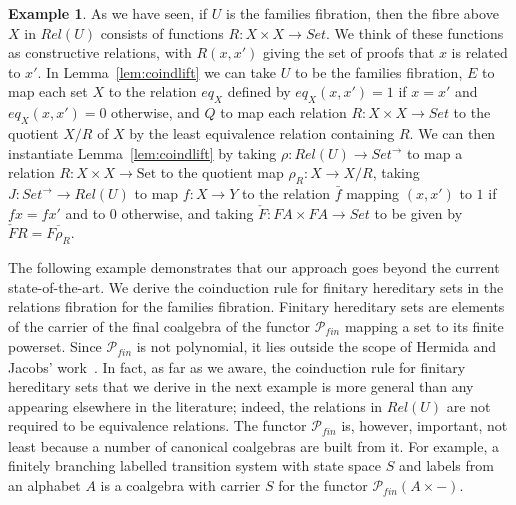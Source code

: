\documentclass{LMCS}
\newcommand{\ra}{\rightarrow}
\newcommand{\Set}{\mbox{Set}}
\newcommand\Ps{\mathscr{P}}
\newcommand\Pfi{\Ps\!\!{}_{\mathit{fin}}}
\theoremstyle{plain}
\theoremstyle{remark}
\theoremstyle{definition}
\newtheorem{example}[theorem]{Example}
\begin{document}
\begin{example}\label{ex:famrel}
  As we have seen, if $U$ is the families fibration, then the fibre
  above $X$ in $Rel(U)$ consists of functions $R:X \times X \ra
  Set$. We think of these functions as constructive relations, with
  $R(x,x')$ giving the set of proofs that $x$ is related to $x'$. In
  Lemma~\ref{lem:coindlift} we can take $U$ to be the families
  fibration, $E$ to map each set $X$ to the relation $eq_X$ defined by
  $eq_X (x,x') = 1$ if $x = x'$ and $eq_X (x,x') = 0$ otherwise, and
  $Q$ to map each relation $R:X \times X \ra Set$ to the quotient
  $X/R$ of $X$ by the least equivalence relation containing $R$. We
  can then instantiate Lemma~\ref{lem:coindlift} by taking $\rho :
  Rel(U) \to Set^\to$ to map a relation $R:X \times X \ra \Set$ to the
  quotient map $\rho_R:X \ra X/R$, taking $J : Set^\to \to Rel(U)$ to
  map $f:X \ra Y$ to the relation $\bar{f}$ mapping $(x,x')$ to $1$ if
  $fx = fx'$ and to $0$ otherwise, and taking $\check{F} : FA \times
  FA \to Set$ to be given by $\check{F} R = \overline{F\rho_R}$.
\end{example}

The following example demonstrates that our approach goes beyond the
current state-of-the-art. We derive the coinduction rule for finitary
hereditary sets in the relations fibration for the families
fibration. Finitary hereditary sets are elements of the carrier of the
final coalgebra of the functor $\Pfi$ mapping a set to its finite
powerset. Since $\Pfi$ is not polynomial, it lies outside the scope of
Hermida and Jacobs' work~\cite{hj98}. In fact, as far as we aware, the
coinduction rule for finitary hereditary sets that we derive in the
next example is more general than any appearing elsewhere in the
literature; indeed, the relations in $Rel(U)$ are not required to be
equivalence relations. The functor $\Pfi$ is, however, important, not
least because a number of canonical coalgebras are built from it. For
example, a finitely branching labelled transition system with state
space $S$ and labels from an alphabet $A$ is a coalgebra with carrier
$S$ for the functor $\Pfi (A \times -)$.
\end{document}
